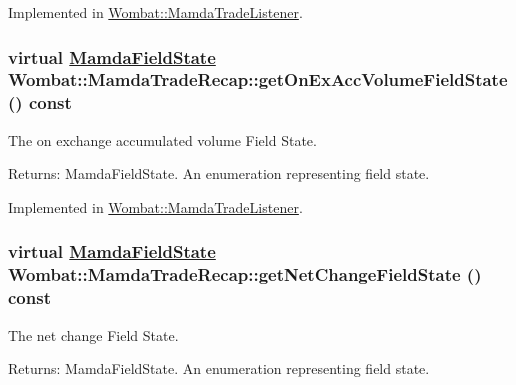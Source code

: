 Implemented in \hyperlink{classWombat_1_1MamdaTradeListener_ebdb316690769ff380d8e1950a878de3}{Wombat::Mamda\-Trade\-Listener}.\hypertarget{classWombat_1_1MamdaTradeRecap_da9986c1440a9f58b1c3c477b4367bbe}{
\subsubsection[getOnExAccVolumeFieldState]{\setlength{\rightskip}{0pt plus 5cm}virtual \hyperlink{namespaceWombat_93aac974f2ab713554fd12a1fa3b7d2a}{Mamda\-Field\-State} Wombat::Mamda\-Trade\-Recap::get\-On\-Ex\-Acc\-Volume\-Field\-State () const}}
\label{classWombat_1_1MamdaTradeRecap_da9986c1440a9f58b1c3c477b4367bbe}


The on exchange accumulated volume Field State. 

\begin{Desc}
\item[Returns:]Mamda\-Field\-State. An enumeration representing field state. \end{Desc}


Implemented in \hyperlink{classWombat_1_1MamdaTradeListener_ce848079dc4e2282b59ca502f891e436}{Wombat::Mamda\-Trade\-Listener}.\hypertarget{classWombat_1_1MamdaTradeRecap_d9ba46964e6719b4a53c2d9abcf30314}{
\subsubsection[getNetChangeFieldState]{\setlength{\rightskip}{0pt plus 5cm}virtual \hyperlink{namespaceWombat_93aac974f2ab713554fd12a1fa3b7d2a}{Mamda\-Field\-State} Wombat::Mamda\-Trade\-Recap::get\-Net\-Change\-Field\-State () const}}
\label{classWombat_1_1MamdaTradeRecap_d9ba46964e6719b4a53c2d9abcf30314}


The net change Field State. 

\begin{Desc}
\item[Returns:]Mamda\-Field\-State. An enumeration representing field state. \end{Desc}


